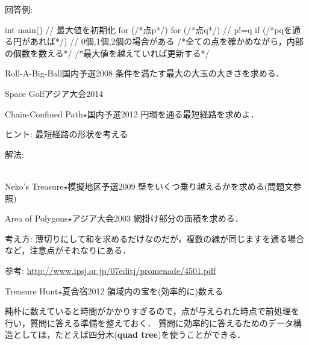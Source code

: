 回答例:

\begin{cbox}
int main() {
  // 最大値を初期化
  for (/*点p*/) {
    for (/*点q*/) { // p!=q
      if (/*pqを通る円があれば*/) { // 0個,1個,2個の場合がある
         /*全ての点を確かめながら，内部の個数を数える*/
         /*最大値を越えていれば更新する*/
      }
    }
  }
}
\end{cbox}


\begin{pbox}{Roll-A-Big-Ball}{国内予選2008}
条件を満たす最大の大玉の大きさを求める．

\end{pbox}

\begin{pbox}{Space Golf}{アジア大会2014}
  
\end{pbox}

\begin{pbox}{Chain-Confined Path$\star$}{国内予選2012}
  円環を通る最短経路を求めよ．

\end{pbox}

ヒント: 最短経路の形状を考える
 
解法: \textcolor{white}{始点，終点，各円の交点を頂点とし，各点の間を直線で移動可能かを求めて辺を張り，最短路問題を解く．}

\begin{pbox}{Neko's Treasure$\star$}{模擬地区予選2009}
壁をいくつ乗り越えるかを求める(問題文参照)

\end{pbox}

\begin{pbox}{Area of Polygons$\star$}{アジア大会2003}
網掛け部分の面積を求める．

\end{pbox}
考え方: 薄切りにして和を求めるだけなのだが，複数の線が同じますを通る場合など，注意点がそれなりにある．

参考: \url{http://www.ipsj.or.jp/07editj/promenade/4501.pdf}

\begin{pbox}{Treasure Hunt$\star$}{夏合宿2012}
領域内の宝を(効率的に)数える

\end{pbox}

純朴に数えていると時間がかかりすぎるので，点が与えられた時点で前処理を
行い，質問に答える準備を整えておく．
質問に効率的に答えるためのデータ構造としては，たとえば四分木(\textbf{quad tree})を使うことができる．



